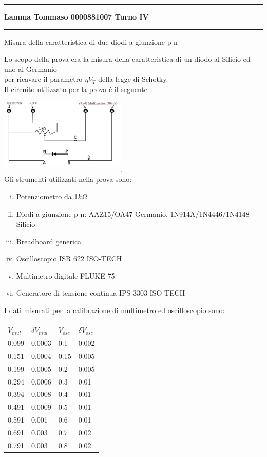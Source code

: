\documentclass{article}
\begin{document}
    \hrule
    \begin{center}
        \textbf{ Lamma    Tommaso    0000881007        Turno    IV }
    \end{center}
    \hrule
    \begin{center}
        {\huge Misura della caratteristica di due diodi a giunzione p-n}\\
    \end{center}
    \vspace{0.2cm}
    Lo scopo della prova era la misura della caratteristica di un diodo al Silicio ed uno al Germanio\\
    per ricavare il parametro $\eta V_T$ della legge di Schotky.\\
    Il circuito utilizzato per la prova \'e il seguente \\
    \includegraphics[width = 6cm, height = 4cm]{circuito.png}.\\
    Gli strumenti utilizzati nella prova sono:
    \begin{enumerate}[(i)]
        \item Potenziometro da 1$k\Omega$
        \item Diodi a giunzione p-n: AAZ15/OA47 Germanio, 1N914A/1N4446/1N4148 Silicio
        \item Breadboard generica
        \item Oscilloscopio ISR 622 ISO-TECH
        \item Multimetro digitale FLUKE 75
        \item Generatore di tensione continua IPS 3303 ISO-TECH
    \end{enumerate}
    I dati misurati per la calibrazione di multimetro ed oscilloscopio sono:\\
    \begin{tabular}{|p{1cm}|p{1cm}|p{1cm}|p{1cm}|}
        \hline
        $V_{mul}$ & $\delta V_{mul}$ & $V_{osc}$ & $\delta V_{osc}$ \\
        \hline
        0.099 & 0.0003 & 0.1 & 0.002\\
        0.151 & 0.0004 & 0.15 & 0.005\\
        0.199 & 0.0005 & 0.2 & 0.005\\
        0.294 & 0.0006 & 0.3 & 0.01\\
        0.394 & 0.0008 & 0.4 & 0.01\\
        0.491 & 0.0009 & 0.5 & 0.01\\
        0.591 & 0.001 & 0.6 & 0.01\\
        0.691 & 0.003 & 0.7 & 0.02\\
        0.791 & 0.003 & 0.8 & 0.02\\
        \hline
    \end{tabular}\\
\end{document}
